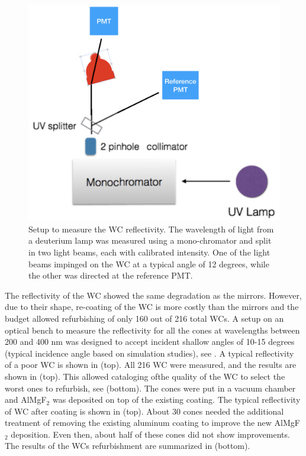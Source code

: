 \begin{figure}
	\centering
	\includegraphics[width=0.95\columnwidth,keepaspectratio]{img/wcSetup.png}
	\caption{Setup to measure the WC reflectivity. The wavelength of light from a deuterium lamp was measured using a mono-chromator and split in two
            light beams, each with calibrated intensity. One of the light beams impinged on the WC at a typical angle of 12 degrees,
            while the other was directed at the reference PMT. }
	\label{fig:wcSetup}
\end{figure}

The reflectivity of the WC showed the same degradation as the mirrors. However, due to their shape, re-coating of the WC is more costly than the mirrors and the budget allowed
refurbishing of only 160 out of 216 total WCs.
A setup on an optical bench to measure the reflectivity for all the cones at wavelengths between 200 and 400 nm was designed to accept incident
shallow angles of 10-15 degrees (typical incidence angle based on simulation studies), see . A typical reflectivity of a poor WC is shown in  (top).
All 216 WC were measured, and the results are shown in  (top). This allowed cataloging ofthe quality of the WC to select the worst ones to refurbish,
see  (bottom).
The cones were put in a vacuum chamber and AlMgF$_2$ was deposited on top of the existing coating. The typical reflectivity of WC after coating is shown in  (top).
About 30 cones needed the additional treatment of removing the existing aluminum coating to improve the new AlMgF$_2$ deposition. Even then, about half of these cones did not show improvements.
The results of the WCs refurbishment are summarized in  (bottom).


